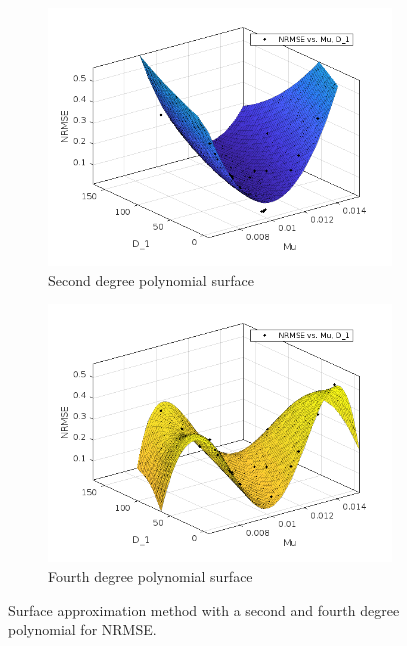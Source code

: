 \begin{figure}
    \centering
    \begin{subfigure}[b]{0.45\textwidth}
    \centering
    \includegraphics[width=\textwidth]{Images/ifem/MATLAB/NRMSE2poly.png}
    \caption{Second degree polynomial surface}
    \label{fig:poly2NRMSE}
    \end{subfigure}
    \hfill
    \begin{subfigure}[b]{0.45\textwidth}
    \centering
    \includegraphics[width=\textwidth]{Images/ifem/MATLAB/NRMSE4poly.png}
    \caption{Fourth degree polynomial surface}
    \label{fig:poly4NRMSE}
    \end{subfigure}
    \hspace{0.3cm}
    \caption[Polynomial approximation surfaces - NRMSE]{Surface approximation method with a second and fourth degree polynomial for NRMSE.}
    \label{fig:poly2and4}
\end{figure}
